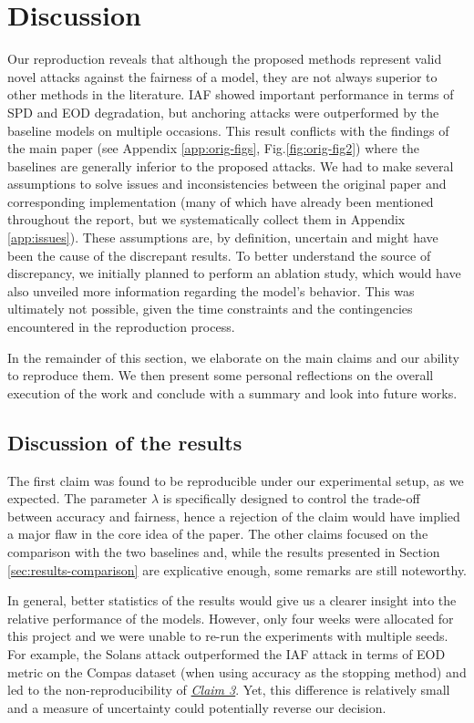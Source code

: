 \section{Discussion}

Our reproduction reveals that although the proposed methods represent valid novel attacks against the fairness of a model, they are not always superior to other methods in the literature. IAF showed important performance in terms of SPD and EOD degradation, but anchoring attacks were outperformed by the baseline models on multiple occasions. This result conflicts with the findings of the main paper (see Appendix \ref{app:orig-figs}, Fig.\ref{fig:orig-fig2}) where the baselines are generally inferior to the proposed attacks. We had to make several assumptions to solve issues and inconsistencies between the original paper and corresponding implementation (many of which have already been mentioned throughout the report, but we systematically collect them in Appendix \ref{app:issues}). These assumptions are, by definition, uncertain and might have been the cause of the discrepant results. To better understand the source of discrepancy, we initially planned to perform an ablation study, which would have also unveiled more information regarding the model's behavior. This was ultimately not possible, given the time constraints and the contingencies encountered in the reproduction process.

In the remainder of this section, we elaborate on the main claims and our ability to reproduce them. We then present some personal reflections on the overall execution of the work and conclude with a summary and look into future works.

\subsection{Discussion of the results}
The first claim was found to be reproducible under our experimental setup, as we expected. The parameter $\lambda$ is specifically designed to control the trade-off between accuracy and fairness, hence a rejection of the claim would have implied a major flaw in the core idea of the paper. The other claims focused on the comparison with the two baselines and, while the results presented in Section \ref{sec:results-comparison} are explicative enough, some remarks are still noteworthy.

In general, better statistics of the results would give us a clearer insight into the relative performance of the models. However, only four weeks were allocated for this project and we were unable to re-run the experiments with multiple seeds. For example, the Solans attack outperformed the IAF attack in terms of EOD metric on the Compas dataset (when using accuracy as the stopping method) and led to the non-reproducibility of \hyperlink{claim-3}{\textit{Claim 3}}. Yet, this difference is relatively small and a measure of uncertainty could potentially reverse our decision. 

